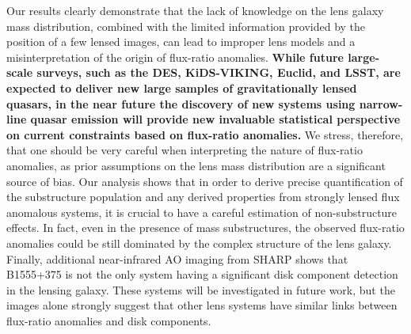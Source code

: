 \documentclass[useAMS,usenatbib]{mn2e}
\begin{document}
Our results clearly
demonstrate that the lack of knowledge on the lens galaxy mass
distribution, combined with the limited information provided by the
position of a few lensed images, can lead to improper lens models and
a misinterpretation of the origin of flux-ratio anomalies. \textbf{While future large-scale surveys, such as the DES, KiDS-VIKING, Euclid, and LSST, are expected to
deliver new large samples of gravitationally lensed quasars, in the
near future the discovery of new systems using narrow-line quasar
emission \citep{N14} will provide new invaluable statistical
perspective on current constraints based on flux-ratio anomalies.} We stress,
therefore, that one should be very careful when interpreting the
nature of flux-ratio anomalies, as prior assumptions on the lens mass
distribution are a significant source of bias. Our analysis shows that
in order to derive precise quantification of the substructure
population and any derived properties from strongly lensed flux
anomalous systems, it is crucial to have a careful estimation of
non-substructure effects. In fact, even in the presence of mass
substructures, the observed flux-ratio anomalies could be still
dominated by the complex structure of the lens galaxy. Finally,
additional near-infrared AO imaging from SHARP shows that B1555+375 is
not the only system having a significant disk component detection in
the lensing galaxy.  These systems will be investigated in future
work, but the images alone strongly suggest that other lens systems
have similar links between flux-ratio anomalies and disk components.
\end{document}
